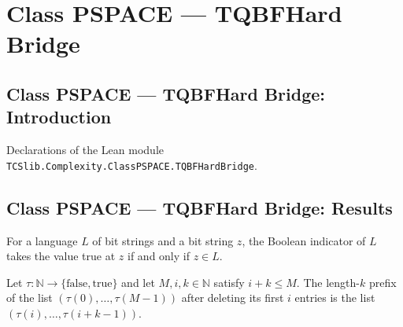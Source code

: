 \section{Class PSPACE --- TQBFHard Bridge}
\subsection*{Class PSPACE --- TQBFHard Bridge: Introduction}

Declarations of the Lean module \texttt{TCSlib.Complexity.ClassPSPACE.TQBFHardBridge}.

\subsection*{Class PSPACE --- TQBFHard Bridge: Results}

\begin{theorem}
\label{Complexity.TQBFHard.indicator_eq_true_iff}
\leanok
{}
For a language $L$ of bit strings and a bit string $z$, the Boolean indicator of $L$
takes the value true at $z$ if and only if $z\in L$.
\end{theorem}

\begin{theorem}
\label{Complexity.TQBFHard.ofFn_drop_take}
\leanok
{}
Let $\tau:\mathbb{N}\to\{\mathrm{false},\mathrm{true}\}$ and let $M,i,k\in\mathbb{N}$
satisfy $i+k\le M$. The length-$k$ prefix of the list $(\tau(0),\ldots,\tau(M-1))$ after
deleting its first $i$ entries is the list $(\tau(i),\ldots,\tau(i+k-1))$.
\end{theorem}

